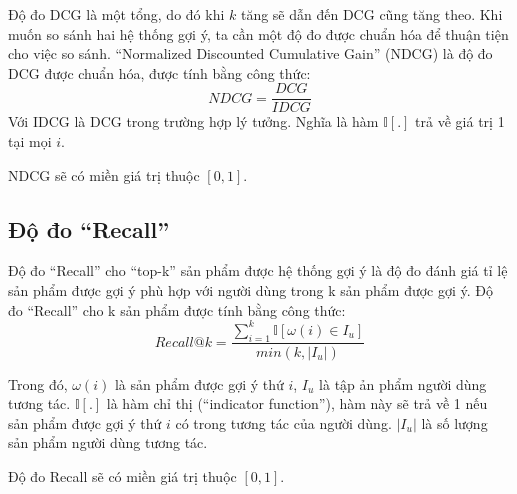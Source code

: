     Độ đo DCG là một tổng, do đó khi $k$ tăng sẽ dẫn đến DCG cũng tăng theo. Khi muốn so sánh hai hệ thống gợi ý, ta cần một độ đo được chuẩn hóa để thuận tiện cho việc so sánh. ``Normalized Discounted Cumulative Gain'' (NDCG) là độ đo DCG được chuẩn hóa, được tính bằng công thức:
    \begin{equation}
        NDCG = \frac{DCG}{IDCG}
    \end{equation}
    Với IDCG là DCG trong trường hợp lý tưởng. Nghĩa là hàm $\mathbb{I}[.]$ trả về giá trị 1 tại mọi $i$.

    NDCG sẽ có miền giá trị thuộc $[0, 1]$.

\subsection{Độ đo ``Recall''}
    Độ đo ``Recall'' cho ``top-k'' sản phẩm được hệ thống gợi ý là độ đo đánh giá tỉ lệ sản phẩm được gợi ý phù hợp với người dùng trong k sản phẩm được gợi ý.
    Độ đo ``Recall'' cho k sản phẩm được tính bằng công thức:
    \begin{equation}
        Recall@k = \frac{\sum_{i = 1}^k \mathbb{I}[\omega(i) \in I_u]}{min(k, |I_u|)}
    \end{equation}
    
    Trong đó, $\omega(i)$ là sản phẩm được gợi ý thứ $i$, $I_u$ là tập ản phẩm người dùng tương tác. $\mathbb{I}[.]$ là hàm chỉ thị (``indicator function''), hàm này sẽ trả về 1 nếu sản phẩm được gợi ý thứ $i$ có trong tương tác của người dùng. $|I_u|$ là số lượng sản phẩm người dùng tương tác.

    Độ đo Recall sẽ có miền giá trị thuộc $[0, 1]$.


